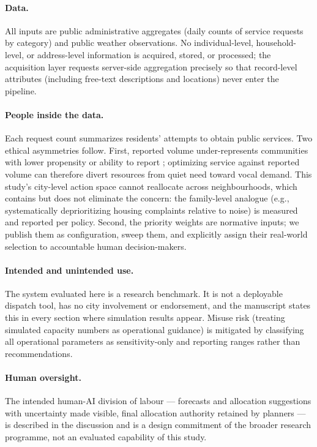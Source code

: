 \paragraph{Data.} All inputs are public administrative aggregates (daily
counts of service requests by category) and public weather observations.
No individual-level, household-level, or address-level information is
acquired, stored, or processed; the acquisition layer requests
server-side aggregation precisely so that record-level attributes
(including free-text descriptions and locations) never enter the
pipeline.

\paragraph{People inside the data.} Each request count summarizes
residents' attempts to obtain public services. Two ethical asymmetries
follow. First, reported volume under-represents communities with lower
propensity or ability to report \citep{kontokosta2017equity,
kontokosta2021bias}; optimizing service against reported volume can
therefore divert resources from quiet need toward vocal demand. This
study's city-level action space cannot reallocate across neighbourhoods,
which contains but does not eliminate the concern: the family-level
analogue (e.g., systematically deprioritizing housing complaints relative
to noise) is measured and reported per policy. Second, the priority
weights are normative inputs; we publish them as configuration, sweep
them, and explicitly assign their real-world selection to accountable
human decision-makers.

\paragraph{Intended and unintended use.} The system evaluated here is a
research benchmark. It is not a deployable dispatch tool, has no city
involvement or endorsement, and the manuscript states this in every
section where simulation results appear. Misuse risk (treating simulated
capacity numbers as operational guidance) is mitigated by classifying all
operational parameters as sensitivity-only and reporting ranges rather
than recommendations.

\paragraph{Human oversight.} The intended human-AI division of labour ---
forecasts and allocation suggestions with uncertainty made visible,
final allocation authority retained by planners --- is described in the
discussion and is a design commitment of the broader research programme,
not an evaluated capability of this study.
